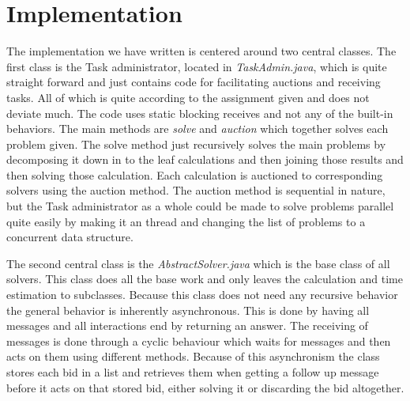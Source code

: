 \section{Implementation}\label{sec:implementation}
The implementation we have written is centered around two central classes. The
first class is the Task administrator, located in \textit{TaskAdmin.java}, which
is quite straight forward and just contains code for facilitating auctions and
receiving tasks. All of which is quite according to the assignment given and
does not deviate much. The code uses static blocking receives and not any of the
built-in behaviors. The main methods are \textit{solve} and \textit{auction}
which together solves each problem given. The solve method just recursively
solves the main problems by decomposing it down in to the leaf calculations and
then joining those results and then solving those calculation. Each calculation
is auctioned to corresponding solvers using the auction method. The
auction method is sequential in nature, but the Task administrator as a whole
could be made to solve problems parallel quite easily by making it an thread and
changing the list of problems to a concurrent data structure.

The second central class is the \textit{AbstractSolver.java} which is the base
class of all solvers. This class does all the base work and only leaves the
calculation and time estimation to subclasses. Because this class does not need
any recursive behavior the general behavior is inherently asynchronous. This is
done by having all messages and all interactions end by returning an answer. The
receiving of messages is done through a cyclic behaviour which waits for
messages and then acts on them using different methods. Because of this
asynchronism the class stores each bid in a list and retrieves them when getting
a follow up message before it acts on that stored bid, either solving it or
discarding the bid altogether.
